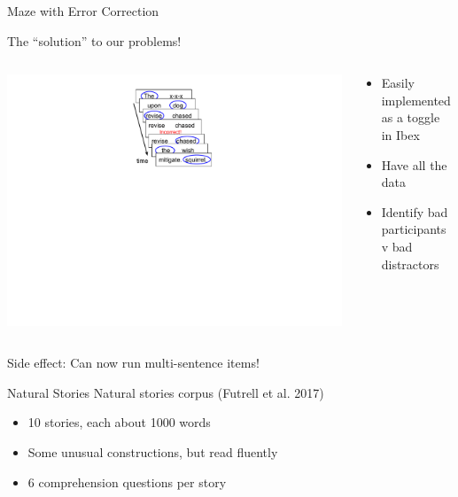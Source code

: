 \documentclass[12pt, xcolor=beamer,table,usenames,dvipsnames, ignorenonframetext, ngerman]{beamer}
\begin{document}
\begin{frame}{Maze with Error Correction}

{\large The ``solution'' to our problems!} \pause

\begin{columns}
	\begin{column}{0.3\textwidth}
		\begin{center}
		\includegraphics[clip, trim=9cm 12.5cm 10cm 1cm,width=\textwidth]{maze_diagram.pdf}
		\end{center}
		
	\end{column} \pause 
	\begin{column}{0.7\textwidth} 
		\begin{center}
			\begin{itemize}
				\item Easily implemented as a toggle in Ibex \pause
				\item Have all the data \pause
				\item Identify bad participants v bad distractors 
			\end{itemize}
		\end{center}
	\end{column}
\end{columns}
\medskip
\pause

Side effect: Can now run multi-sentence items!
\end{frame}


\begin{frame}{Natural Stories}
Natural stories corpus (Futrell et al. 2017)
\begin{itemize}
	\item 10 stories, each about 1000 words
	\item Some unusual constructions, but read fluently
	\item 6 comprehension questions per story
\end{itemize}

\end{frame}
\end{document}
